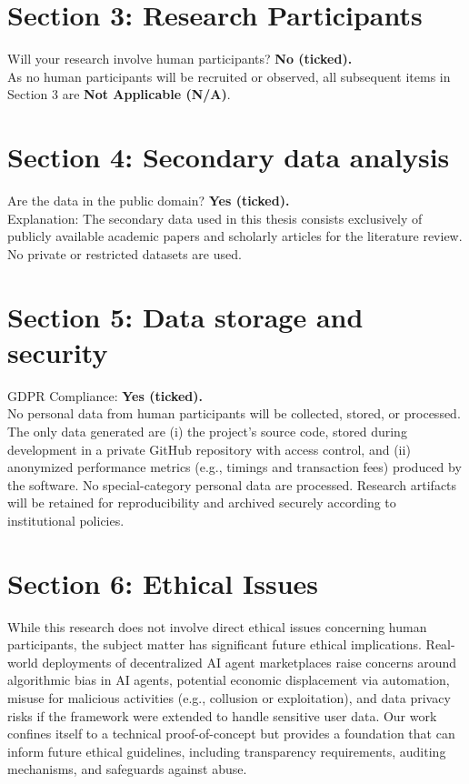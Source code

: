\section*{Section 3: Research Participants}
Will your research involve human participants? \textbf{No (ticked).} \\
As no human participants will be recruited or observed, all subsequent items in Section 3 are \textbf{Not Applicable (N/A)}.

\section*{Section 4: Secondary data analysis}
Are the data in the public domain? \textbf{Yes (ticked).} \\
Explanation: The secondary data used in this thesis consists exclusively of publicly available academic papers and scholarly articles for the literature review. No private or restricted datasets are used.

\section*{Section 5: Data storage and security}
GDPR Compliance: \textbf{Yes (ticked).} \\
No personal data from human participants will be collected, stored, or processed. The only data generated are (i) the project's source code, stored during development in a private GitHub repository with access control, and (ii) anonymized performance metrics (e.g., timings and transaction fees) produced by the software. No special-category personal data are processed. Research artifacts will be retained for reproducibility and archived securely according to institutional policies.

\section*{Section 6: Ethical Issues}
While this research does not involve direct ethical issues concerning human participants, the subject matter has significant future ethical implications. Real-world deployments of decentralized AI agent marketplaces raise concerns around algorithmic bias in AI agents, potential economic displacement via automation, misuse for malicious activities (e.g., collusion or exploitation), and data privacy risks if the framework were extended to handle sensitive user data. Our work confines itself to a technical proof-of-concept but provides a foundation that can inform future ethical guidelines, including transparency requirements, auditing mechanisms, and safeguards against abuse.

